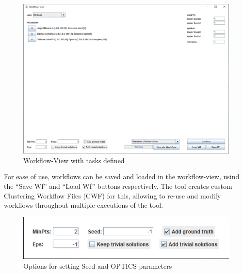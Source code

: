 \documentclass[
	a4paper,
	english,
	twoside,
	openright,               
	11pt                            
	]{report}
\begin{document}
\begin{figure}[h]
	\centering
	\includegraphics[scale=.43]{workflow-view-tasks}
	\caption{Workflow-View with tasks defined}
	\label{fig:workflow-view-tasks}
\end{figure}

For ease of use, workflows can be saved and loaded in the workflow-view, usind the ``Save Wf'' and ``Load Wf'' buttons respectively. The tool creates custom Clustering Workflow Files (CWF) for this, allowing to re-use and modify workflows throughout multiple executions of the tool.

\begin{figure}[h]
	\centering
	\includegraphics[scale=.65]{workflow-options}
	\caption{Options for setting Seed and OPTICS parameters}
	\label{fig:workflow-options}
\end{figure}
\end{document}
